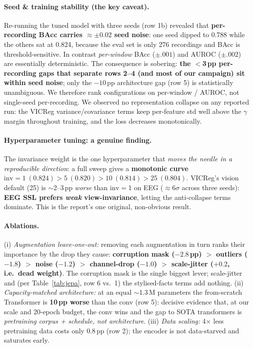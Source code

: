 \documentclass[10pt,a4paper]{article}
\begin{document}
\paragraph{Seed \& training stability (the key caveat).} Re-running the tuned model with three seeds
(row 1b) revealed that \textbf{per-recording BAcc carries $\approx\pm0.02$ seed noise}: one seed dipped to
0.788 while the others sat at 0.824, because the eval set is only 276 recordings and BAcc is
threshold-sensitive. In contrast \emph{per-window} BAcc ($\pm.001$) and AUROC ($\pm.002$) are essentially
deterministic. The consequence is sobering: \textbf{the $<$3\,pp per-recording gaps that separate
rows 2--4 (and most of our campaign) sit within seed noise}; only the $-10$\,pp architecture gap (row 5) is
statistically unambiguous. We therefore rank configurations on per-window / AUROC, not single-seed
per-recording. We observed no representation collapse on any reported run: the VICReg variance/covariance
terms keep per-feature std well above the $\gamma$ margin throughout training, and the loss decreases
monotonically.

\paragraph{Hyperparameter tuning: a genuine finding.} The invariance weight is the one hyperparameter that
\emph{moves the needle in a reproducible direction}: a full sweep gives a \textbf{monotonic curve
$\mathrm{inv}=1\ (0.824) > 5\ (0.820) > 10\ (0.814) > 25\ (0.804)$}. VICReg's vision default (25) is
$\sim$2--3\,pp \emph{worse} than $\mathrm{inv}=1$ on EEG ($\approx6\sigma$ across three seeds): \textbf{EEG
SSL prefers \emph{weak} view-invariance}, letting the anti-collapse terms dominate. This is the report's one
original, non-obvious result.

\paragraph{Ablations.} (i) \emph{Augmentation leave-one-out:} removing each augmentation in turn ranks their
importance by the drop they cause: \textbf{corruption mask ($-2.8$\,pp) $>$ outliers ($-1.8$) $>$ noise
($-1.2$) $>$ channel-drop ($-1.0$) $>$ scale-jitter ($+0.2$, i.e.\ dead weight)}. The corruption mask is the
single biggest lever; scale-jitter and (per Table~\ref{tab:jepa}, row 6 vs.\ 1) the stylised-facts terms add
nothing. (ii) \emph{Capacity-matched architecture:} at an equal $\sim$1.3\,M parameters the from-scratch
Transformer is \textbf{10\,pp worse} than the conv (row 5): decisive evidence that, at our scale and
20-epoch budget, the conv wins and the gap to SOTA transformers is \emph{pretraining corpus + schedule, not
architecture}. (iii) \emph{Data scaling:} 4$\times$ less pretraining data costs only 0.8\,pp (row 2); the
encoder is not data-starved and saturates early.
\end{document}
